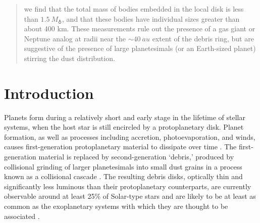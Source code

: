 \documentclass[modern]{aastex62}
\begin{document}
\begin{abstract}
we find that the total mass of bodies embedded in the local disk
is less than $\SI{1.5}{M_\earth}$, and that 
these bodies have individual sizes greater than about 400 km.
These measurements rule out the presence of a gas giant or Neptune analog at radii near the $\sim \SI{40}{au}$ extent of the debris ring, but are suggestive of the presence of large planetesimals (or an Earth-sized planet) stirring the dust distribution.
\end{abstract}

\section{Introduction}
\label{section: introduction}

%
%
%
Planets form during a relatively short and early stage in the lifetime of stellar systems,  when the host star is still encircled by a protoplanetary disk.
Planet formation, as well as processes including accretion, photoevaporation, and winds, causes first-generation protoplanetary material to dissipate over time \citep{williams&cieza11,ercolano&pascucci17}.
The first-generation material is replaced by second-generation `debris,' produced by 
collisional grinding of larger planetesimals into small dust grains in a process known as a collisional cascade \citep{wyatt2008}. 
The resulting debris disks, optically thin and significantly less luminous than their protoplanetary counterparts, are currently observable around at least 25\% of Solar-type stars and are likely to be at least as common as the exoplanetary systems with which they are thought to be associated \citep{montesinos16}.
\end{document}
